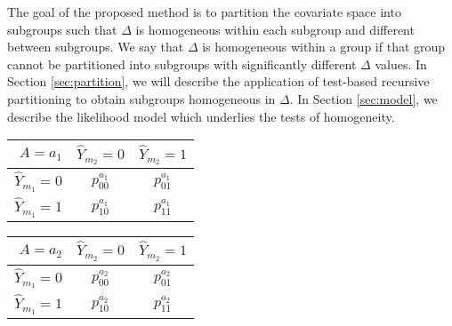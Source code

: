 \documentclass[11pt, sigconf, svgnames]{acmart}
\begin{document}
The goal of the proposed method is to partition the covariate space into
subgroups such that $\Delta$ is homogeneous within each subgroup and different
between subgroups.  We say that $\Delta$ is homogeneous within a group if
that group cannot be partitioned into subgroups with significantly different
$\Delta$ values.  In Section \ref{sec:partition}, we will describe the
application of test-based recursive partitioning to obtain subgroups
homogeneous in $\Delta$.  In Section \ref{sec:model}, we describe the
likelihood model which underlies the tests of homogeneity.


\begin{table*}[ht]
  \begin{minipage}{0.49\textwidth}
    \centering
  \begin{tabular}{r|cc}
    \toprule
    $A = a_1$ & $\hat{Y}_{m_2}=0$ & $\hat{Y}_{m_2}=1$\\
    \hline
    $\hat{Y}_{m_1}=0$ & $p_{00}^{a_1}$ & $p_{01}^{a_1}$\\
    $\hat{Y}_{m_1}=1$ & $p_{10}^{a_1}$ & $p_{11}^{a_1}$ \\
    \bottomrule
  \end{tabular}
  \end{minipage}
  \begin{minipage}{0.49\textwidth}
    \centering
\begin{tabular}{r|cc}
  \toprule
    $A = a_2$ & $\hat{Y}_{m_2}=0$ & $\hat{Y}_{m_2}=1$\\
    \hline
    $\hat{Y}_{m_1}=0$ & $p_{00}^{a_2}$ & $p_{01}^{a_2}$\\
    $\hat{Y}_{m_1}=1$ & $p_{10}^{a_2}$ & $p_{11}^{a_2}$\\
    \bottomrule
  \end{tabular}
  \end{minipage}
  \caption{Conditional on the sensitive attribute $A\in\{a_1,a_2\}$, the observed  $(\hat{Y}_{m_1},\hat{Y}_{m_2})$ can be modeled as a multinomial 
  with parameters $p_{ij}^a$.  For the case of FPR disparities discussed in Section \ref{sec:model}, all quantities in this table should be interpreted as being further conditioned on $Y = 0$. }
  \label{tab:multinom}
\end{table*}
\end{document}
